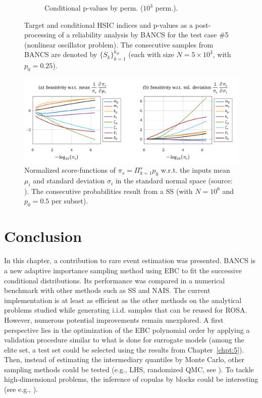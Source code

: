 \begin{figure}
\begin{subfigure}[b]{0.48\linewidth}
        \caption{Conditional p-values by perm. ($10^3$ perm.).}
    \end{subfigure}
    \caption{Target and conditional HSIC indices and p-values as a post-processing of a reliability analysis by BANCS for the test case \#5 (nonlinear oscillator problem). 
    The consecutive samples from BANCS are denoted by $\{S_k\}_{k=1}^{k_\#}$ (each with size $N=5\times10^3$, with $p_0=0.25$).}
    \label{fig:rosa_oscillator}
\end{figure}


\begin{figure}
    \centering
    \includegraphics[width=0.9\linewidth]{part3/figures/BANCS/score_function_HDR_JMB.png}
    \caption{Normalized score-functions of $\pi_s = \Pi_{k=1}^s p_0$ w.r.t. the inputs mean $\mu_i$ and standard deviation $\sigma_i$ in the standard normal space (source: \citealp[p.54]{bourinet_2018}). 
            The consecutive probabilities result from a SS (with $N=10^6$ and $p_0=0.5$ per subset).}
    \label{fig:score_functions_oscillator}
\end{figure}



\section{Conclusion}

In this chapter, a contribution to rare event estimation was presented. 
BANCS is a new adaptive importance sampling method using EBC to fit the successive conditional distributions. 
Its performance was compared in a numerical benchmark with other methods such as SS and NAIS. 
The current implementation is at least as efficient as the other methods on the analytical problems studied while generating i.i.d. samples that can be reused for ROSA. 
However, numerous potential improvements remain unexplored. 
A first perspective lies in the optimization of the EBC polynomial order by applying a validation procedure similar to what is done for surrogate models (among the elite set, a test set could be selected using the results from Chapter~\ref{chpt:5}). 
Then, instead of estimating the intermediary quantiles by Monte Carlo, other sampling methods could be tested (e.g., LHS, randomized QMC, see \citealp{tuffin_2019}). 
To tackle high-dimensional problems, the inference of copulas by blocks could be interesting (see e.g., \citealp{lasserre_2022}).

